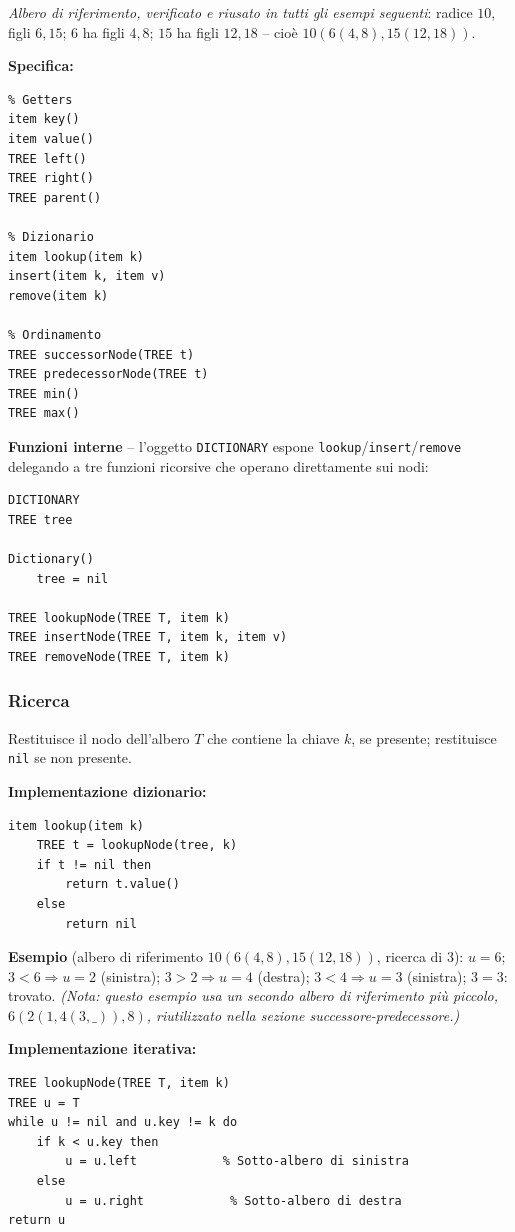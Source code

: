 \documentclass[12pt, a4paper]{article}
\begin{document}
\textit{Albero di riferimento, verificato e riusato in tutti gli esempi seguenti}: radice $10$, figli $6,15$; $6$ ha figli $4,8$; $15$ ha figli $12,18$ -- cioè $10(6(4,8),15(12,18))$.

\textbf{Specifica:}
\begin{verbatim}
% Getters
item key()
item value()
TREE left()
TREE right()
TREE parent()

% Dizionario
item lookup(item k)
insert(item k, item v)
remove(item k)

% Ordinamento
TREE successorNode(TREE t)
TREE predecessorNode(TREE t)
TREE min()
TREE max()
\end{verbatim}

\textbf{Funzioni interne} -- l'oggetto \texttt{DICTIONARY} espone \texttt{lookup}/\texttt{insert}/\texttt{remove} delegando a tre funzioni ricorsive che operano direttamente sui nodi:
\begin{verbatim}
DICTIONARY
TREE tree

Dictionary()
    tree = nil

TREE lookupNode(TREE T, item k)
TREE insertNode(TREE T, item k, item v)
TREE removeNode(TREE T, item k)
\end{verbatim}

\subsubsection{Ricerca}

\begin{tcolorbox}[colback=lightergray!5, colframe=tocsubsec, title=\textbf{\texttt{lookupNode()}}]
Restituisce il nodo dell'albero $T$ che contiene la chiave $k$, se presente; restituisce \texttt{nil} se non presente.
\end{tcolorbox}

\textbf{Implementazione dizionario:}
\begin{verbatim}
item lookup(item k)
    TREE t = lookupNode(tree, k)
    if t != nil then
        return t.value()
    else
        return nil
\end{verbatim}

\textbf{Esempio} (albero di riferimento $10(6(4,8),15(12,18))$, ricerca di $3$): $u=6$; $3<6 \Rightarrow u=2$ (sinistra); $3>2 \Rightarrow u=4$ (destra); $3<4 \Rightarrow u=3$ (sinistra); $3=3$: trovato. \textit{(Nota: questo esempio usa un secondo albero di riferimento più piccolo, $6(2(1,4(3,\_)),8)$, riutilizzato nella sezione successore-predecessore.)}

\textbf{Implementazione iterativa:}
\begin{verbatim}
TREE lookupNode(TREE T, item k)
TREE u = T
while u != nil and u.key != k do
    if k < u.key then
        u = u.left            % Sotto-albero di sinistra
    else
        u = u.right            % Sotto-albero di destra
return u
\end{verbatim}
\end{document}
